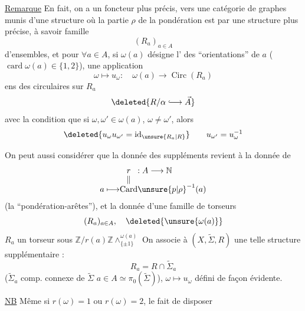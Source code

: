 \uline{Remarque} En fait, on a un foncteur plus précis, vers une catégorie de graphes munis d'une structure où la partie $\rho$ de la pondération est    par une structure plus précise, à savoir   famille
\[
 (R_a)_{a\in A}
\]
d'ensembles, et pour $\forall a\in A$, si $\omega(a)$ désigne l' des
 
``orientations'' de $a$ ($\operatorname{card}\omega(a)\in\{1,2\}$), une application
\[
 \omega\longmapsto u_\omega:\quad \omega(a)\longrightarrow\operatorname{Circ}(R_a)
\]
ens des  circulaires sur $R_a$
\[
 \deleted{R/\alpha\lhook\joinrel\longrightarrow\vec A}
\]
avec la condition que si $\omega,\omega'\in\omega(a)$, $\omega\ne\omega'$, alors
\[
 \deleted{u_\omega u_{\omega'}=\operatorname{id}_{\unsure{R_a|R}}}
 \qquad u_{\omega'}=u_\omega^{-1}
\]

On peut aussi considérer que la donnée des suppléments revient à la donnée de
\[
 \begin{array}{r@{}c@{}l}
 &r&:A\longrightarrow\mathbb N\\[-.3ex]
 &\Vert&\\[-.3ex]
 a\longmapsto&\operatorname{Card}&\unsure{p|\rho}^{-1}(a)
 \end{array}
\]
(la ``pondération-arêtes''), et la donnée d'une famille de torseurs
\[
 (R_a)_{a\in A},\quad \deleted{\unsure{\omega(a)}}
\]
$R_a$ un torseur sous $\mathbb Z/r(a)\mathbb Z\mathbin{\wedge}^{\omega(a)}_{\{\pm1\}}$
On associe à $(X,\widetilde\Sigma,R)$ une telle structure supplémentaire :
\[
 R_a=R\cap\widetilde\Sigma_a
\]
($\widetilde\Sigma_a$  comp. connexe de $\widetilde\Sigma$   $a\in A\simeq\pi_0(\widetilde\Sigma)$),
 
$\omega\longmapsto u_\omega$ défini de façon évidente.

\uline{NB} Même si $r(\omega)=1$ ou $r(\omega)=2$, le fait de disposer
